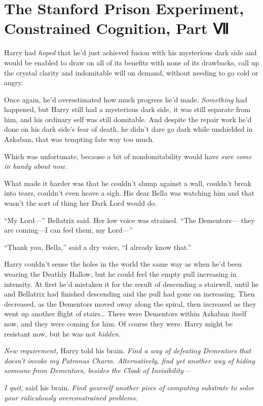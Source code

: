 \chapter{The Stanford Prison Experiment, Constrained Cognition, Part Ⅶ}

Harry had \emph{hoped} that he'd just achieved fusion with his
mysterious dark side and would be enabled to draw on all of its benefits
with none of its drawbacks, call up the crystal clarity and indomitable
will on demand, without needing to go cold or angry.

Once again, he'd overestimated how much progress he'd made.
\emph{Something} had happened, but Harry still had a mysterious dark
side, it was still separate from him, and his ordinary self was still
domitable. And despite the repair work he'd done on his dark side's fear
of death, he didn't dare go dark while unshielded in Azkaban, that was
tempting fate way too much.

Which was unfortunate, because a bit of nondomitability would have
\emph{sure come in handy about now.}

What made it harder was that he couldn't slump against a wall, couldn't
break into tears, couldn't even heave a sigh. His dear Bella was
watching him and that wasn't the sort of thing her Dark Lord would do.

``My Lord---'' Bellatrix said. Her low voice was strained. ``The
Dementors--- they are coming---I can feel them, my Lord---''

``Thank you, Bella,'' said a dry voice, ``I already know that.''

Harry couldn't sense the holes in the world the same way as when he'd
been wearing the Deathly Hallow, but he could feel the empty pull
increasing in intensity. At first he'd mistaken it for the result of
descending a stairwell, until he and Bellatrix had finished descending
and the pull had gone on increasing. Then decreased, as the Dementors
moved away along the spiral, then increased as they went up another
flight of stairs\ldots{} There were Dementors within Azkaban itself now,
and they were coming for him. Of course they were. Harry might be
resistant now, but he was not \emph{hidden.}

\emph{New requirement,} Harry told his brain. \emph{Find a way of
defeating Dementors that doesn't invoke my Patronus Charm.
Alternatively, find yet another way of hiding someone from Dementors,
besides the Cloak of Invisibility---}

\emph{I quit,} said his brain. \emph{Find yourself another piece of
computing substrate to solve your ridiculously overconstrained
problems.}

